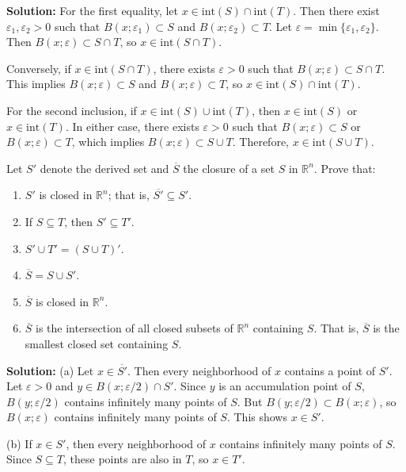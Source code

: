 \textbf{Solution:} For the first equality, let $x \in \text{int}(S) \cap \text{int}(T)$. Then there exist $\varepsilon_1, \varepsilon_2 > 0$ such that $B(x;\varepsilon_1) \subset S$ and $B(x;\varepsilon_2) \subset T$. Let $\varepsilon = \min\{\varepsilon_1, \varepsilon_2\}$. Then $B(x;\varepsilon) \subset S \cap T$, so $x \in \text{int}(S \cap T)$.

Conversely, if $x \in \text{int}(S \cap T)$, there exists $\varepsilon > 0$ such that $B(x;\varepsilon) \subset S \cap T$. This implies $B(x;\varepsilon) \subset S$ and $B(x;\varepsilon) \subset T$, so $x \in \text{int}(S) \cap \text{int}(T)$.

For the second inclusion, if $x \in \text{int}(S) \cup \text{int}(T)$, then $x \in \text{int}(S)$ or $x \in \text{int}(T)$. In either case, there exists $\varepsilon > 0$ such that $B(x;\varepsilon) \subset S$ or $B(x;\varepsilon) \subset T$, which implies $B(x;\varepsilon) \subset S \cup T$. Therefore, $x \in \text{int}(S \cup T)$.

\begin{problembox}
Let $S'$ denote the derived set and $\overline{S}$ the closure of a set $S$ in $\mathbb{R}^n$. Prove that:
\begin{enumerate}[label=\alph*)]
\item $S'$ is closed in $\mathbb{R}^n$; that is, $\overline{S'} \subseteq S'$.
\item If $S \subseteq T$, then $S' \subseteq T'$.
\item $S' \cup T' = (S \cup T)'$.
\item $\overline{S} = S \cup S'$.
\item $\overline{S}$ is closed in $\mathbb{R}^n$.
\item $\overline{S}$ is the intersection of all closed subsets of $\mathbb{R}^n$ containing $S$. That is, $\overline{S}$ is the smallest closed set containing $S$.
\end{enumerate}
\end{problembox}

\textbf{Solution:} 
(a) Let $x \in \overline{S'}$. Then every neighborhood of $x$ contains a point of $S'$. Let $\varepsilon > 0$ and $y \in B(x;\varepsilon/2) \cap S'$. Since $y$ is an accumulation point of $S$, $B(y;\varepsilon/2)$ contains infinitely many points of $S$. But $B(y;\varepsilon/2) \subset B(x;\varepsilon)$, so $B(x;\varepsilon)$ contains infinitely many points of $S$. This shows $x \in S'$.

(b) If $x \in S'$, then every neighborhood of $x$ contains infinitely many points of $S$. Since $S \subseteq T$, these points are also in $T$, so $x \in T'$.

